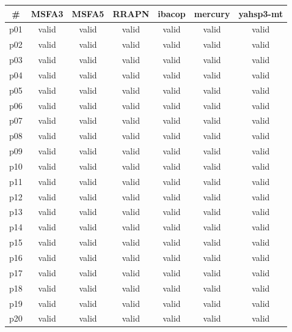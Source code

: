 \begin{tabular}{ccccccc}
\toprule
\textbf{\#} & \textbf{MSFA3} & \textbf{MSFA5} & \textbf{RRAPN} & \textbf{ibacop} & \textbf{mercury} & \textbf{yahsp3-mt}\\
\midrule
p01 & valid & valid & valid & valid & valid & valid\\
p02 & valid & valid & valid & valid & valid & valid\\
p03 & valid & valid & valid & valid & valid & valid\\
p04 & valid & valid & valid & valid & valid & valid\\
p05 & valid & valid & valid & valid & valid & valid\\
p06 & valid & valid & valid & valid & valid & valid\\
p07 & valid & valid & valid & valid & valid & valid\\
p08 & valid & valid & valid & valid & valid & valid\\
p09 & valid & valid & valid & valid & valid & valid\\
p10 & valid & valid & valid & valid & valid & valid\\
p11 & valid & valid & valid & valid & valid & valid\\
p12 & valid & valid & valid & valid & valid & valid\\
p13 & valid & valid & valid & valid & valid & valid\\
p14 & valid & valid & valid & valid & valid & valid\\
p15 & valid & valid & valid & valid & valid & valid\\
p16 & valid & valid & valid & valid & valid & valid\\
p17 & valid & valid & valid & valid & valid & valid\\
p18 & valid & valid & valid & valid & valid & valid\\
p19 & valid & valid & valid & valid & valid & valid\\
p20 & valid & valid & valid & valid & valid & valid\\
\bottomrule
\end{tabular}

